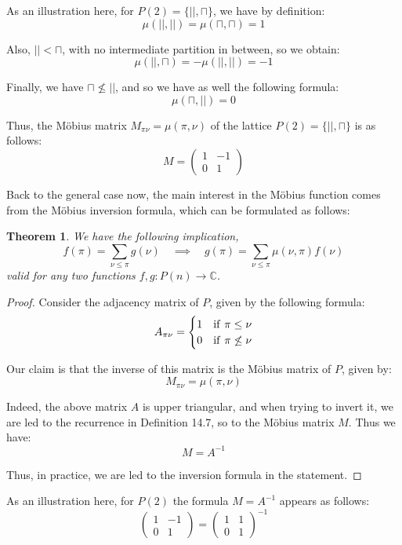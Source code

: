 \documentclass[12pt]{amsbook}
\newtheorem{theorem}{Theorem}[chapter]
\begin{document}
As an illustration here, for $P(2)=\{||,\sqcap\}$, we have by definition:
$$\mu(||,||)=\mu(\sqcap,\sqcap)=1$$

Also, $||<\sqcap$, with no intermediate partition in between, so we obtain:
$$\mu(||,\sqcap)=-\mu(||,||)=-1$$

Finally, we have $\sqcap\not\leq||$, and so we have as well the following formula:
$$\mu(\sqcap,||)=0$$

Thus, the M\"obius matrix $M_{\pi\nu}=\mu(\pi,\nu)$ of the lattice $P(2)=\{||,\sqcap\}$ is as follows:
$$M=\begin{pmatrix}1&-1\\ 0&1\end{pmatrix}$$

Back to the general case now, the main interest in the M\"obius function comes from the M\"obius inversion formula, which can be formulated as follows:


\begin{theorem}
We have the following implication,
$$f(\pi)=\sum_{\nu\leq\pi}g(\nu)
\quad\implies\quad
g(\pi)=\sum_{\nu\leq\pi}\mu(\nu,\pi)f(\nu)$$
valid for any two functions $f,g:P(n)\to\mathbb C$.
\end{theorem}

\begin{proof}
Consider the adjacency matrix of $P$, given by the following formula:
$$A_{\pi\nu}=\begin{cases}
1&{\rm if}\ \pi\leq\nu\\
0&{\rm if}\ \pi\not\leq\nu
\end{cases}$$

Our claim is that the inverse of this matrix is the M\"obius matrix of $P$, given by:
$$M_{\pi\nu}=\mu(\pi,\nu)$$

Indeed, the above matrix $A$ is upper triangular, and when trying to invert it, we are led to the recurrence in Definition 14.7, so to the M\"obius matrix $M$. Thus we have:
$$M=A^{-1}$$

Thus, in practice, we are led to the inversion formula in the statement.
\end{proof}

As an illustration here, for $P(2)$ the formula $M=A^{-1}$ appears as follows:
$$\begin{pmatrix}1&-1\\ 0&1\end{pmatrix}=
\begin{pmatrix}1&1\\ 0&1\end{pmatrix}^{-1}$$
\end{document}
